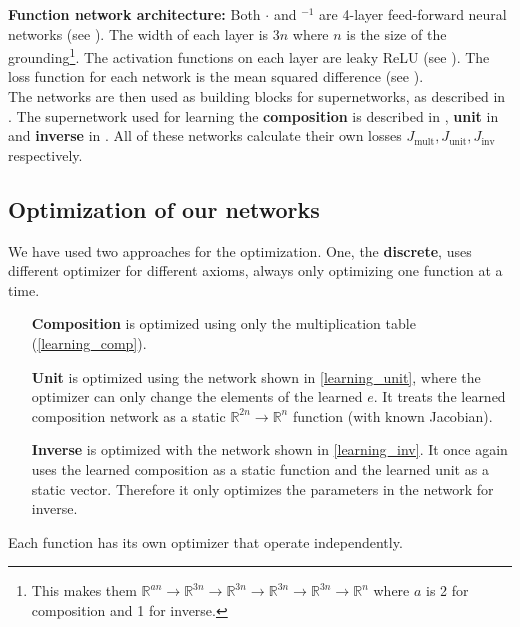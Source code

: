 \textbf{Function network architecture:} Both $\cdot$ and $^{-1}$ are 4-layer feed-forward neural networks (see ). The width of each layer is $3n$ where $n$ is the size of the grounding\footnote{This makes them $\mathbb{R}^{an}\rightarrow\mathbb{R}^{3n}\rightarrow\mathbb{R}^{3n}\rightarrow\mathbb{R}^{3n}\rightarrow\mathbb{R}^{3n}\rightarrow\mathbb{R}^{n}$ where $a$ is 2 for composition and 1 for inverse.}. The activation functions on each layer are leaky ReLU (see ). The loss function for each network is the mean squared difference (see ).\\

The networks are then used as building blocks for supernetworks, as described in . The supernetwork used for learning the \textbf{composition} is described in , \textbf{unit} in  and \textbf{inverse} in . All of these networks calculate their own losses $J_{\text{mult}},J_{\text{unit}},J_{\text{inv}}$ respectively.\\

\subsection{Optimization of our networks}
\label{section:optimization_IRL}
We have used two approaches for the optimization. One, the \textbf{discrete}, uses different optimizer for different axioms, always only optimizing one function at a time.
\begin{itemize}
	\item[\textbf{Composition}] is optimized using only the multiplication table (\autoref{learning_comp}).
	\item[\textbf{Unit}] is optimized using the network shown in  \autoref{learning_unit}, where the optimizer can only change the elements of the learned $e$. It treats the learned composition network as a static $\mathbb{R}^{2n}\rightarrow\mathbb{R}^n$ function (with known Jacobian).
	\item[\textbf{Inverse}] is optimized with the network shown in \autoref{learning_inv}. It once again uses the learned composition as a static function and the learned unit as a static vector. Therefore it only optimizes the parameters in the network for inverse.
\end{itemize}
Each function has its own optimizer that operate independently.


